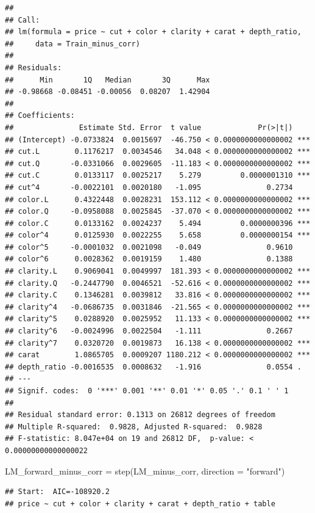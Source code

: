 \documentclass[
]{article}
\newenvironment{Shaded}{\begin{snugshade}}{\end{snugshade}}
\newcommand{\AttributeTok}[1]{\textcolor[rgb]{0.77,0.63,0.00}{#1}}
\newcommand{\FunctionTok}[1]{\textcolor[rgb]{0.00,0.00,0.00}{#1}}
\newcommand{\NormalTok}[1]{#1}
\newcommand{\OtherTok}[1]{\textcolor[rgb]{0.56,0.35,0.01}{#1}}
\newcommand{\StringTok}[1]{\textcolor[rgb]{0.31,0.60,0.02}{#1}}
\begin{document}
\begin{verbatim}
##
## Call:
## lm(formula = price ~ cut + color + clarity + carat + depth_ratio,
##     data = Train_minus_corr)
##
## Residuals:
##      Min       1Q   Median       3Q      Max
## -0.98668 -0.08451 -0.00056  0.08207  1.42904
##
## Coefficients:
##               Estimate Std. Error  t value             Pr(>|t|)
## (Intercept) -0.0733824  0.0015697  -46.750 < 0.0000000000000002 ***
## cut.L        0.1176217  0.0034546   34.048 < 0.0000000000000002 ***
## cut.Q       -0.0331066  0.0029605  -11.183 < 0.0000000000000002 ***
## cut.C        0.0133117  0.0025217    5.279         0.0000001310 ***
## cut^4       -0.0022101  0.0020180   -1.095               0.2734
## color.L      0.4322448  0.0028231  153.112 < 0.0000000000000002 ***
## color.Q     -0.0958088  0.0025845  -37.070 < 0.0000000000000002 ***
## color.C      0.0133162  0.0024237    5.494         0.0000000396 ***
## color^4      0.0125930  0.0022255    5.658         0.0000000154 ***
## color^5     -0.0001032  0.0021098   -0.049               0.9610
## color^6      0.0028362  0.0019159    1.480               0.1388
## clarity.L    0.9069041  0.0049997  181.393 < 0.0000000000000002 ***
## clarity.Q   -0.2447790  0.0046521  -52.616 < 0.0000000000000002 ***
## clarity.C    0.1346281  0.0039812   33.816 < 0.0000000000000002 ***
## clarity^4   -0.0686735  0.0031846  -21.565 < 0.0000000000000002 ***
## clarity^5    0.0288920  0.0025952   11.133 < 0.0000000000000002 ***
## clarity^6   -0.0024996  0.0022504   -1.111               0.2667
## clarity^7    0.0320720  0.0019873   16.138 < 0.0000000000000002 ***
## carat        1.0865705  0.0009207 1180.212 < 0.0000000000000002 ***
## depth_ratio -0.0016535  0.0008632   -1.916               0.0554 .
## ---
## Signif. codes:  0 '***' 0.001 '**' 0.01 '*' 0.05 '.' 0.1 ' ' 1
##
## Residual standard error: 0.1313 on 26812 degrees of freedom
## Multiple R-squared:  0.9828, Adjusted R-squared:  0.9828
## F-statistic: 8.047e+04 on 19 and 26812 DF,  p-value: < 0.00000000000000022
\end{verbatim}

\begin{Shaded}
\begin{Highlighting}[]
\NormalTok{LM\_forward\_minus\_corr }\OtherTok{=} \FunctionTok{step}\NormalTok{(LM\_minus\_corr, }\AttributeTok{direction =} \StringTok{"forward"}\NormalTok{)}
\end{Highlighting}
\end{Shaded}

\begin{verbatim}
## Start:  AIC=-108920.2
## price ~ cut + color + clarity + carat + depth_ratio + table
\end{verbatim}
\end{document}
